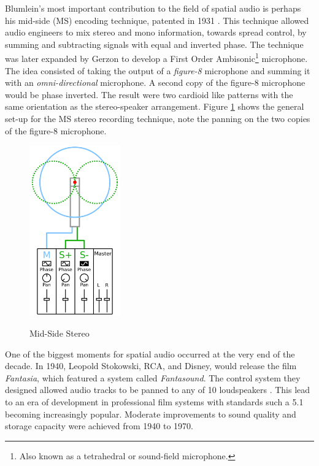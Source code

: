 Blumlein's most important contribution to the field of spatial audio is perhaps his mid-side (MS) encoding technique, patented in 1931 \cite{billingsley1987simulated}. This technique allowed audio engineers to mix stereo and mono information, towards spread control, by summing and subtracting signals with equal and inverted phase. The technique was later expanded by Gerzon to develop a First Order Ambisonic\footnote{Also known as a tetrahedral or sound-field microphone.} microphone. The idea consisted of taking the output of a \textit{figure-8} microphone and summing it with an \textit{omni-directional} microphone. A second copy of the figure-8 microphone would be phase inverted. The result were two cardioid like patterns with the same orientation as the stereo-speaker arrangement. Figure \ref{fig:ms_stereo} shows the general set-up for the MS stereo recording technique, note the panning on the two copies of the figure-8 microphone. 

\begin{figure}[h!]%
\centering
\includegraphics[width=0.35\textwidth]{img/ms_stereo.svg.png} 
\label{fig:ms_stereo}
\caption{Mid-Side Stereo \cite{ms_stereo_pic}}
\end{figure}

One of the biggest moments for spatial audio occurred at the very end of the decade. In 1940, Leopold Stokowski, RCA, and Disney, would release the film \textit{Fantasia}, which featured a system called \textit{Fantasound}. The control system they designed allowed audio tracks to be panned to any of 10 loudspeakers \cite{klapholz1991fantasia}. This lead to an era of development in professional film systems with standards such a 5.1 becoming increasingly popular. Moderate improvements to sound quality and storage capacity were achieved from 1940 to 1970.

